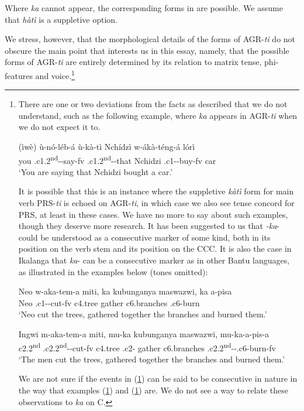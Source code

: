 \documentclass[output=paper,
modfonts
]{langscibook}
\begin{document}
Where \textit{ka} cannot appear, the corresponding forms in  are possible. We assume that \textit{hàtì} is a suppletive option.\largerpage

We stress, however, that the morphological details of the forms of AGR-\textit{ti} do not obscure the main point that interests us in this essay, namely, that the possible forms of AGR-\textit{ti} are entirely determined by its relation to matrix tense, phi-features and voice.\footnote{There are one or two deviations from the facts as described that we do not understand, such as the following example, where \textit{ka} appears in AGR-\textit{ti} when we do not expect it to.

\ea\label{24} \gll (ìwè)	ù-nó-léb-á ù-kà-tì Nchídzì w-ákà-téng-á lórì\\				
you .c1.2\textsuperscript{nd}--say-fv  .c1.2\textsuperscript{nd}--that  Nchidzi .c1--buy-fv	car\\ 
	\glt `You are saying that Nchidzi bought a car.' \z

It is possible that this is an instance where the suppletive \textit{kàtì} form for main verb PRS-\textit{ti} is echoed on AGR-\textit{ti}, in which case we also see tense concord for PRS, at least in these cases. We have no more to say about such examples, though they deserve more research. It has been suggested to us that \textit{-ka}- could be understood as a consecutive marker of some kind, both in its position on the verb stem and its position on the CCC. It is also the case in Ikalanga that \textit{ka}- can be a consecutive marker as in other Bantu languages, as illustrated in the examples below (tones omitted):

\ea\label{FN7.1} \gll Neo w-aka-tem-a miti, ka	kubunganya	maswazwi, ka a-pisa\\
      Neo .c1--cut-fv c4.tree  gather c6.branches  .c6-burn\\
      \glt `Neo cut the trees, gathered together the branches and burned them.'\z
      
 \ea\label{FN7.2}  \gll Ingwi	m-aka-tem-a	miti, mu-ka kubunganya maswazwi, mu-ka-a-pis-a\\
       c2.2\textsuperscript{nd}	.c2.2\textsuperscript{nd}--cut-fv	c4.tree	.c2- gather	 c6.branches 			.c2.2\textsuperscript{nd}--.c6-burn-fv\\
	\glt `The men cut the trees, gathered together the branches and burned them.'  \z

We are not sure if the events in (\ref{24}) can be said to be consecutive in nature in the way that examples (\ref{FN7.1}) and (\ref{FN7.2}) are. We do not see a way to relate these observations to \textit{ka} on C.}
\end{document}
